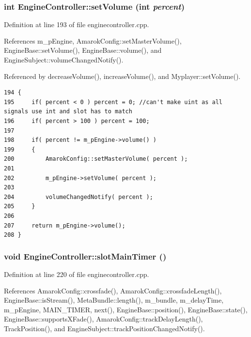 \subsubsection{\setlength{\rightskip}{0pt plus 5cm}int Engine\-Controller::set\-Volume (int {\em percent})\hspace{0.3cm}{\tt  [slot]}}\label{classEngineController_EngineControlleri9}




Definition at line 193 of file enginecontroller.cpp.

References m\_\-p\-Engine, Amarok\-Config::set\-Master\-Volume(), Engine\-Base::set\-Volume(), Engine\-Base::volume(), and Engine\-Subject::volume\-Changed\-Notify().

Referenced by decrease\-Volume(), increase\-Volume(), and Myplayer::set\-Volume().



\footnotesize\begin{verbatim}194 {
195     if( percent < 0 ) percent = 0; //can't make uint as all signals use int and slot has to match
196     if( percent > 100 ) percent = 100;
197 
198     if( percent != m_pEngine->volume() )
199     {
200         AmarokConfig::setMasterVolume( percent );
201 
202         m_pEngine->setVolume( percent );
203 
204         volumeChangedNotify( percent );
205     }
206 
207     return m_pEngine->volume();
208 }
\end{verbatim}\normalsize 
{}
\subsubsection{\setlength{\rightskip}{0pt plus 5cm}void Engine\-Controller::slot\-Main\-Timer ()\hspace{0.3cm}{\tt  [inline, private, slot]}}\label{classEngineController_EngineControllerk0}




Definition at line 220 of file enginecontroller.cpp.

References Amarok\-Config::crossfade(), Amarok\-Config::crossfade\-Length(), Engine\-Base::is\-Stream(), Meta\-Bundle::length(), m\_\-bundle, m\_\-delay\-Time, m\_\-p\-Engine, MAIN\_\-TIMER, next(), Engine\-Base::position(), Engine\-Base::state(), Engine\-Base::supports\-XFade(), Amarok\-Config::track\-Delay\-Length(), Track\-Position(), and Engine\-Subject::track\-Position\-Changed\-Notify().


